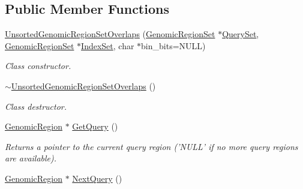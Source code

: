 \subsection*{Public Member Functions}
\begin{DoxyCompactItemize}
\item 
\hyperlink{classUnsortedGenomicRegionSetOverlaps_aaa858364bf0a3d7986c9d0838a73ccab}{UnsortedGenomicRegionSetOverlaps} (\hyperlink{classGenomicRegionSet}{GenomicRegionSet} $\ast$\hyperlink{classGenomicRegionSetOverlaps_ae513304379055f6d379bc5907733dbe2}{QuerySet}, \hyperlink{classGenomicRegionSet}{GenomicRegionSet} $\ast$\hyperlink{classGenomicRegionSetOverlaps_ac587bf854c827381493735b473622e03}{IndexSet}, char $\ast$bin\_\-bits=NULL)
\begin{DoxyCompactList}\small\item\em Class constructor. \end{DoxyCompactList}\item 
\hypertarget{classUnsortedGenomicRegionSetOverlaps_a7682171bb52c651af44e4e8f3bf33f52}{
\hyperlink{classUnsortedGenomicRegionSetOverlaps_a7682171bb52c651af44e4e8f3bf33f52}{$\sim$UnsortedGenomicRegionSetOverlaps} ()}
\label{classUnsortedGenomicRegionSetOverlaps_a7682171bb52c651af44e4e8f3bf33f52}

\begin{DoxyCompactList}\small\item\em Class destructor. \end{DoxyCompactList}\item 
\hypertarget{classUnsortedGenomicRegionSetOverlaps_abf7e2f8d35f7a9cf8441caa9d765de44}{
\hyperlink{classGenomicRegion}{GenomicRegion} $\ast$ \hyperlink{classUnsortedGenomicRegionSetOverlaps_abf7e2f8d35f7a9cf8441caa9d765de44}{GetQuery} ()}
\label{classUnsortedGenomicRegionSetOverlaps_abf7e2f8d35f7a9cf8441caa9d765de44}

\begin{DoxyCompactList}\small\item\em Returns a pointer to the current query region ('NULL' if no more query regions are available). \end{DoxyCompactList}\item 
\hypertarget{classUnsortedGenomicRegionSetOverlaps_a96e68ef99a958665f5da74572edcc854}{
\hyperlink{classGenomicRegion}{GenomicRegion} $\ast$ \hyperlink{classUnsortedGenomicRegionSetOverlaps_a96e68ef99a958665f5da74572edcc854}{NextQuery} ()}
\label{classUnsortedGenomicRegionSetOverlaps_a96e68ef99a958665f5da74572edcc854}


\end{DoxyCompactItemize}
